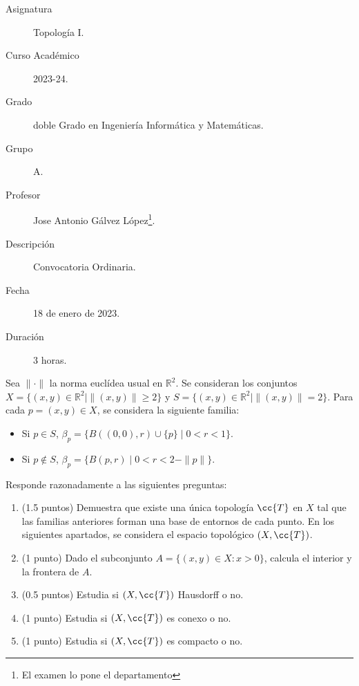 \documentclass[12pt]{article}
\newcommand{\T}[0]{\cc{T}}
\begin{document}

    
    

    \begin{description}
        \item[Asignatura] Topología I.
        \item[Curso Académico] 2023-24.
        \item[Grado] doble Grado en Ingeniería Informática y Matemáticas.
        \item[Grupo] A.
        \item[Profesor] Jose Antonio Gálvez López\footnote{El examen lo pone el departamento}.
        \item[Descripción] Convocatoria Ordinaria.
        \item[Fecha] 18 de enero de 2023.
        \item[Duración] 3 horas.
    
    \end{description}
    \newpage
    
    \begin{ejercicio}[5 puntos]
        Sea $\| \cdot \|$ la norma euclídea usual en $\mathbb{R}^2$. Se consideran los conjuntos
        $X = \{(x,y) \in \mathbb{R}^2 \mid \| (x,y) \| \geq 2\}$ y $S = \{(x,y) \in \mathbb{R}^2 \mid \| (x,y) \| = 2\}$.
        Para cada $p = (x,y) \in X$, se considera la siguiente familia:
        \begin{itemize}
          \item Si $p \in S$, $\beta_p = \{B((0,0), r) \cup \{p\} \mid 0 < r < 1\}$.
          \item Si $p \notin S$, $\beta_p = \{B(p,r) \mid 0 < r < 2 - \| p \|\}$.
        \end{itemize}
        Responde razonadamente a las siguientes preguntas:
        \begin{enumerate}
          \item(1.5 puntos) Demuestra que existe una única topología $\T$ en $X$ tal que las familias anteriores forman una base de entornos de cada punto. En los siguientes apartados, se considera el espacio topológico $(X,\T)$.
          \item(1 punto) Dado el subconjunto $A = \{(x,y) \in X : x > 0\}$, calcula el interior y la frontera de $A$.
          \item(0.5 puntos) Estudia si $(X,\T)$ Hausdorff o no.
          \item(1 punto) Estudia si $(X,\T)$ es conexo o no.
          \item(1 punto) Estudia si $(X,\T)$ es compacto o no.
        \end{enumerate}

    \end{ejercicio}
\end{document}
